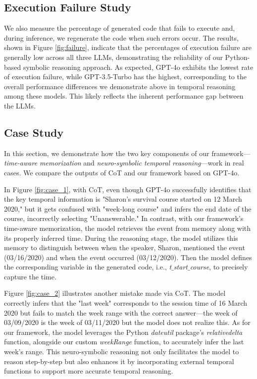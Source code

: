 \subsection{Execution Failure Study}
We also measure the percentage of generated code that fails to execute and, during inference, we regenerate the code when such errors occur. The results, shown in Figure \ref{fig:failure}, indicate that the percentages of execution failure are generally low across all three LLMs, demonstrating the reliability of our Python-based symbolic reasoning approach. As expected, GPT-4o exhibits the lowest rate of execution failure, while GPT-3.5-Turbo has the highest, corresponding to the overall performance differences we demonstrate above in temporal reasoning among these models. This likely reflects the inherent performance gap between the LLMs.

\subsection{Case Study}
In this section, we demonstrate how the two key components of our framework—\textit{time-aware memorization} and \textit{neuro-symbolic temporal reasoning}—work in real cases. We compare the outputs of CoT and our framework based on GPT-4o.

In Figure \ref{fig:case_1}, with CoT, even though GPT-4o successfully identifies that the key temporal information is "Sharon's survival course started on 12 March 2020," but it gets confused with "week-long course" and infers the end date of the course, incorrectly selecting "Unanswerable." In contrast, with our framework’s time-aware memorization, the model retrieves the event from memory along with its properly inferred time. During the reasoning stage, the model utilizes this memory to distinguish between when the speaker, Sharon, mentioned the event (03/16/2020) and when the event occurred (03/12/2020). Then the model defines the corresponding variable in the generated code, i.e., \textit{t$\_$start$\_$course}, to precisely capture the time.

Figure \ref{fig:case_2} illustrates another mistake made via CoT. The model correctly infers that the "last week" corresponds to the session time of 16 March 2020 but fails to match the week range with the correct answer—the week of 03/09/2020 is the week of 03/11/2020 but the model does not realize this. As for our framework, the model leverages the Python \textit{dateutil} package's \textit{relativedelta} function, alongside our custom \textit{weekRange} function, to accurately infer the last week's range. This neuro-symbolic reasoning not only facilitates the model to reason step-by-step but also enhances it by incorporating external temporal functions to support more accurate temporal reasoning.